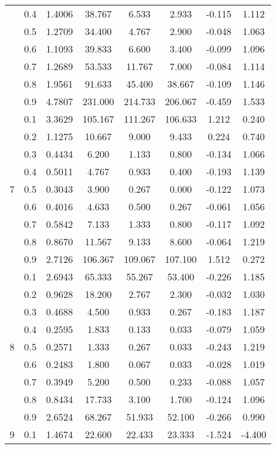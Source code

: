 \documentclass[11pt,a4paper]{report}
\begin{document}
\begin{longtable}{ | c | c || c | c | c | c | c | c | }
 & 0.4 & 1.4006 & 38.767 & 6.533 & 2.933 & -0.115 & 1.112 \\
 & 0.5 & 1.2709 & 34.400 & 4.767 & 2.900 & -0.048 & 1.063 \\
 & 0.6 & 1.1093 & 39.833 & 6.600 & 3.400 & -0.099 & 1.096 \\
 & 0.7 & 1.2689 & 53.533 & 11.767 & 7.000 & -0.084 & 1.114 \\
 & 0.8 & 1.9561 & 91.633 & 45.400 & 38.667 & -0.109 & 1.146 \\
 & 0.9 & 4.7807 & 231.000 & 214.733 & 206.067 & -0.459 & 1.533 \\
 \hline
\multirow{9}{*}{7} & 0.1 & 3.3629 & 105.167 & 111.267 & 106.633 & 1.212 & 0.240 \\
 & 0.2 & 1.1275 & 10.667 & 9.000 & 9.433 & 0.224 & 0.740 \\
 & 0.3 & 0.4434 & 6.200 & 1.133 & 0.800 & -0.134 & 1.066 \\
 & 0.4 & 0.5011 & 4.767 & 0.933 & 0.400 & -0.193 & 1.139 \\
 & 0.5 & 0.3043 & 3.900 & 0.267 & 0.000 & -0.122 & 1.073 \\
 & 0.6 & 0.4016 & 4.633 & 0.500 & 0.267 & -0.061 & 1.056 \\
 & 0.7 & 0.5842 & 7.133 & 1.333 & 0.800 & -0.117 & 1.092 \\
 & 0.8 & 0.8670 & 11.567 & 9.133 & 8.600 & -0.064 & 1.219 \\
 & 0.9 & 2.7126 & 106.367 & 109.067 & 107.100 & 1.512 & 0.272 \\
 \hline
\multirow{9}{*}{8} & 0.1 & 2.6943 & 65.333 & 55.267 & 53.400 & -0.226 & 1.185 \\
 & 0.2 & 0.9628 & 18.200 & 2.767 & 2.300 & -0.032 & 1.030 \\
 & 0.3 & 0.4688 & 4.500 & 0.933 & 0.267 & -0.183 & 1.187 \\
 & 0.4 & 0.2595 & 1.833 & 0.133 & 0.033 & -0.079 & 1.059 \\
 & 0.5 & 0.2571 & 1.333 & 0.267 & 0.033 & -0.243 & 1.219 \\
 & 0.6 & 0.2483 & 1.800 & 0.067 & 0.033 & -0.028 & 1.019 \\
 & 0.7 & 0.3949 & 5.200 & 0.500 & 0.233 & -0.088 & 1.057 \\
 & 0.8 & 0.8434 & 17.733 & 3.100 & 1.700 & -0.124 & 1.096 \\
 & 0.9 & 2.6524 & 68.267 & 51.933 & 52.100 & -0.266 & 0.990 \\
 \hline
\multirow{9}{*}{9} & 0.1 & 1.4674 & 22.600 & 22.433 & 23.333 & -1.524 & -4.400 \\

\end{longtable}
\end{document}
